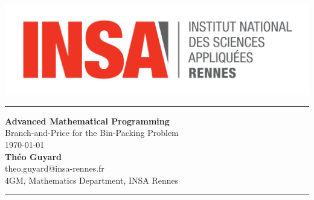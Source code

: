 \begin{titlepage}
	\includegraphics[scale=0.1]{img/logo-insa.png}
	\vfill
	\noindent\rule{\textwidth}{1pt}
	\begin{center}
		{\Huge \textbf{Advanced Mathematical Programming}}
		\vspace{0.1cm} \\
		{\Large Branch-and-Price for the Bin-Packing Problem}
		\vspace{0.5cm} \\
		\today
		\vspace{0.5cm} \\
		\textbf{Théo Guyard}
		\vspace{0.1cm} \\
		theo.guyard@insa-rennes.fr
		\vspace{0.1cm} \\
		4GM, Mathematics Department, INSA Rennes
		\vspace{0.5cm} \\
	\end{center}
	\noindent\rule{\textwidth}{1pt}
	\vspace{3cm}
	\vfill
	
\end{titlepage}
